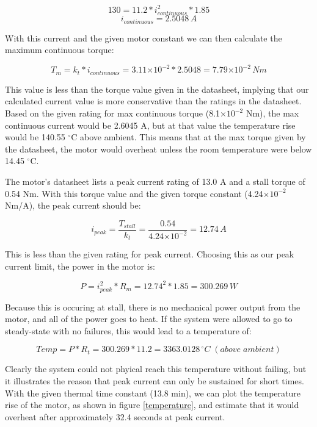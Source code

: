 \documentclass{article}
\theoremstyle{plain}
\theoremstyle{definition}
\theoremstyle{remark}
\providecommand{\e}[1]{\ensuremath{\times 10^{#1}}}
\begin{document}
$$130 = 11.2*i_{continuous}^2*1.85$$
$$i_{continuous} = 2.5048 \,A$$

With this current and the given motor constant we can then calculate the maximum continuous torque:

$$T_{m} = k_{t}*i_{continuous} = 3.11\e{-2}*2.5048 = 7.79\e{-2}\, Nm$$

This value is less than the torque value given in the datasheet, implying that our calculated current value is more conservative than the ratings in the datasheet. Based on the given rating for max continuous torque (8.1$\e{-2}$ Nm), the max continuous current would be 2.6045 A, but at that value the temperature rise would be 140.55 $^\circ$C above ambient. This means that at the max torque given by the datasheet, the motor would overheat unless the room temperature were below 14.45 $^\circ$C. 

The motor's datasheet lists a peak current rating of 13.0 A and a stall torque of 0.54 Nm. With this torque value and the given torque constant (4.24$\e{-2}$ Nm/A), the peak current should be:


$$i_{peak} = \frac{T_{stall}}{k_{t}} = \frac{0.54}{4.24\e{-2}} = 12.74 \,A$$

This is less than the given rating for peak current. Choosing this as our peak current limit, the power in the motor is:


$$P = i_{peak}^2 * R_{m} = 12.74^2 * 1.85 = 300.269 \,W$$

Because this is occuring at stall, there is no mechanical power output from the motor, and all of the power goes to heat. If the system were allowed to go to steady-state with no failures, this would lead to a temperature of:

$$Temp = P * R_{t} = 300.269 * 11.2 = 3363.0128  \,{^\circ}C\;(above \;ambient)$$ 

Clearly the system could not phyical reach this temperature without failing, but it illustrates the reason that peak current can only be sustained for short times. With the given thermal time constant (13.8 min), we can plot the temperature rise of the motor, as shown in figure \ref{temperature}, and estimate that it would overheat after approximately 32.4 seconds at peak current. 
\end{document}

